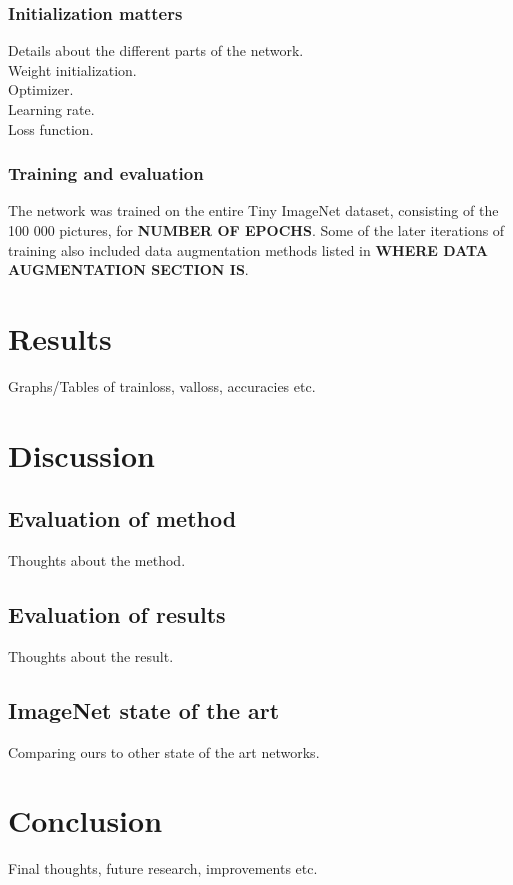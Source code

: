 \documentclass{kthreport}
\begin{document}
\subsubsection{Initialization matters}

Details about the different parts of the network.\\
Weight initialization.\\
Optimizer.\\
Learning rate.\\
Loss function.\\




\subsubsection{Training and evaluation}
The network was trained on the entire Tiny ImageNet dataset, consisting of the 100 000 pictures, for \textbf{NUMBER OF EPOCHS}. Some of the later iterations of training also included data augmentation methods listed in \textbf{WHERE DATA AUGMENTATION SECTION IS}.

\section{Results}
Graphs/Tables of trainloss, valloss, accuracies etc.

\section{Discussion}

\subsection{Evaluation of method}
Thoughts about the method.

\subsection{Evaluation of results}

Thoughts about the result.

\subsection{ImageNet state of the art}

Comparing ours to other state of the art networks.

\section{Conclusion}
Final thoughts, future research, improvements etc.

{}

\end{document}

